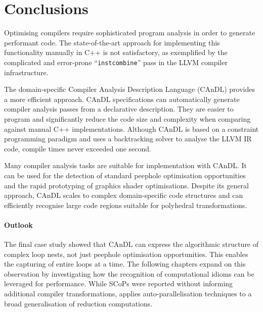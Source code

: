 \section{Conclusions}

    Optimising compilers require sophisticated program analysis in order to
    generate performant code.
    The state-of-the-art approach for implementing this functionality manually
    in C++ is not satisfactory, as exemplified by the complicated and
    error-prone ``{\tt instcombine}'' pass in the LLVM compiler infrastructure.

    The domain-specific Compiler Analysis Description Language (CAnDL) provides
    a more efficient approach.
    CAnDL specifications can automatically generate compiler analysis
    passes from a declarative description.
    They are easier to program and significantly reduce the code size and
    complexity when comparing against manual C++ implementations.
    Although CAnDL is based on a constraint programming paradigm and uses a
    backtracking solver to analyse the LLVM IR code, compile times never
    exceeded one second.

    Many compiler analysis tasks are suitable for implementation with CAnDL.
    It can be used for the detection of standard peephole optimisation
    opportunities and the rapid prototyping of graphics shader optimisations.
    Despite its general approach, CAnDL scales to complex domain-specific code
    structures and can efficiently recognise large code regions suitable for
    polyhedral transformations.

    \paragraph*{Outlook}
    The final case study showed that CAnDL can express the algorithmic structure
    of complex loop nests, not just peephole optimisation
    opportunities.
    This enables the capturing of entire loops at a time.
    The following chapters expand on this observation by investigating how the
    recognition of computational idioms can be leveraged for performance.
    While SCoPs were reported without informing additional compiler
    transformations,  applies auto-parallelisation
    techniques to a broad generalisation of reduction computations.
